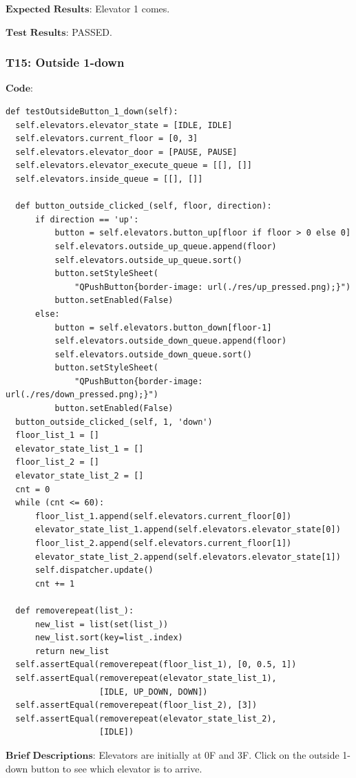 \documentclass{article}
\begin{document}
$\textbf{Expected Results:}$
Elevator 1 comes.

$\textbf{Test Results:}$
PASSED.

\subsubsection*{T15: Outside 1-down}
$\textbf{Code:}$
\begin{lstlisting}
def testOutsideButton_1_down(self):
  self.elevators.elevator_state = [IDLE, IDLE]
  self.elevators.current_floor = [0, 3]
  self.elevators.elevator_door = [PAUSE, PAUSE]
  self.elevators.elevator_execute_queue = [[], []]
  self.elevators.inside_queue = [[], []]

  def button_outside_clicked_(self, floor, direction):
      if direction == 'up':
          button = self.elevators.button_up[floor if floor > 0 else 0]
          self.elevators.outside_up_queue.append(floor)
          self.elevators.outside_up_queue.sort()
          button.setStyleSheet(
              "QPushButton{border-image: url(./res/up_pressed.png);}")
          button.setEnabled(False)
      else:
          button = self.elevators.button_down[floor-1]
          self.elevators.outside_down_queue.append(floor)
          self.elevators.outside_down_queue.sort()
          button.setStyleSheet(
              "QPushButton{border-image: url(./res/down_pressed.png);}")
          button.setEnabled(False)
  button_outside_clicked_(self, 1, 'down')
  floor_list_1 = []
  elevator_state_list_1 = []
  floor_list_2 = []
  elevator_state_list_2 = []
  cnt = 0
  while (cnt <= 60):
      floor_list_1.append(self.elevators.current_floor[0])
      elevator_state_list_1.append(self.elevators.elevator_state[0])
      floor_list_2.append(self.elevators.current_floor[1])
      elevator_state_list_2.append(self.elevators.elevator_state[1])
      self.dispatcher.update()
      cnt += 1

  def removerepeat(list_):
      new_list = list(set(list_))
      new_list.sort(key=list_.index)
      return new_list
  self.assertEqual(removerepeat(floor_list_1), [0, 0.5, 1])
  self.assertEqual(removerepeat(elevator_state_list_1),
                   [IDLE, UP_DOWN, DOWN])
  self.assertEqual(removerepeat(floor_list_2), [3])
  self.assertEqual(removerepeat(elevator_state_list_2),
                   [IDLE])
\end{lstlisting}

$\textbf{Brief Descriptions:}$
Elevators are initially at 0F and 3F. Click on the outside 1-down button to see which elevator is to arrive.
\end{document}
